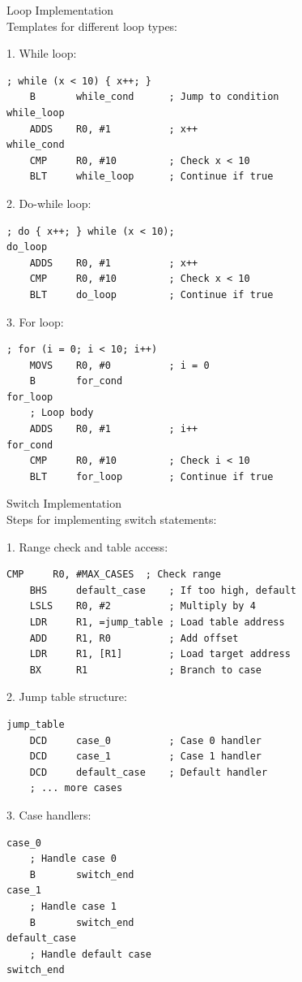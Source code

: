 \begin{KR}{Loop Implementation}\\
Templates for different loop types:

1. While loop:
\begin{lstlisting}[language=armasm, style=basesmol]
    ; while (x < 10) { x++; }
    B       while_cond      ; Jump to condition
while_loop
    ADDS    R0, #1          ; x++
while_cond
    CMP     R0, #10         ; Check x < 10
    BLT     while_loop      ; Continue if true
\end{lstlisting}

2. Do-while loop:
\begin{lstlisting}[language=armasm, style=basesmol]
    ; do { x++; } while (x < 10);
do_loop
    ADDS    R0, #1          ; x++
    CMP     R0, #10         ; Check x < 10
    BLT     do_loop         ; Continue if true
\end{lstlisting}

3. For loop:
\begin{lstlisting}[language=armasm, style=basesmol]
    ; for (i = 0; i < 10; i++)
    MOVS    R0, #0          ; i = 0
    B       for_cond
for_loop
    ; Loop body
    ADDS    R0, #1          ; i++
for_cond
    CMP     R0, #10         ; Check i < 10
    BLT     for_loop        ; Continue if true
\end{lstlisting}
\end{KR}

\begin{KR}{Switch Implementation}\\
Steps for implementing switch statements:

1. Range check and table access:
\begin{lstlisting}[language=armasm, style=basesmol]
    CMP     R0, #MAX_CASES  ; Check range
    BHS     default_case    ; If too high, default
    LSLS    R0, #2          ; Multiply by 4
    LDR     R1, =jump_table ; Load table address
    ADD     R1, R0          ; Add offset
    LDR     R1, [R1]        ; Load target address
    BX      R1              ; Branch to case
\end{lstlisting}

2. Jump table structure:
\begin{lstlisting}[language=armasm, style=basesmol]
jump_table
    DCD     case_0          ; Case 0 handler
    DCD     case_1          ; Case 1 handler
    DCD     default_case    ; Default handler
    ; ... more cases
\end{lstlisting}

3. Case handlers:
\begin{lstlisting}[language=armasm, style=basesmol]
case_0
    ; Handle case 0
    B       switch_end
case_1
    ; Handle case 1
    B       switch_end
default_case
    ; Handle default case
switch_end
\end{lstlisting}
\end{KR}

